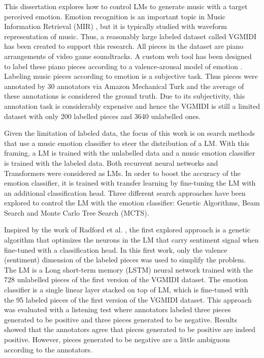 This dissertation explores how to control LMs to generate music with a target perceived emotion. Emotion recognition is an important topic in Music Information Retrieval (MIR) \cite{kim2010music}, but it is typically studied with waveform representation of music. Thus, a reasonably large labeled dataset called VGMIDI has been created to support this research. All pieces in the dataset are piano arrangements of video game soundtracks. A custom web tool has been designed to label these piano pieces according to a valence-arousal model of emotion \cite{russell1980circumplex}. Labeling music pieces according to emotion is a subjective task. Thus pieces were annotated by 30 annotators via Amazon Mechanical Turk and the average of these annotations is considered the ground truth. Due to its subjectivity, this annotation task is considerably expensive and hence the VGMIDI is still a limited dataset with only 200 labelled pieces and 3640 unlabelled ones.

Given the limitation of labeled data, the focus of this work is on search methods that use a music emotion classifier to steer the distribution of a LM. With this framing, a LM is trained with the unlabelled data and a music emotion classifier is trained with the labeled data. Both recurrent neural networks and Transformers were considered as LMs. In order to boost the accuracy of the emotion classifier, it is trained with transfer learning by fine-tuning the LM with an additional classification head. Three different search approaches have been explored to control the LM with the emotion classifier: Genetic Algorithms, Beam Search and Monte Carlo Tree Search (MCTS).

Inspired by the work of Radford et al. \cite{radford_2017}, the first explored approach is a genetic algorithm that optimizes the neurons in the LM that carry sentiment signal when fine-tuned with a classification head. In this first work, only the valence (sentiment) dimension of the labeled pieces was used to simplify the problem. The LM is a Long short-term memory (LSTM) neural network trained with the 728 unlabelled pieces of the first version of the VGMIDI dataset. The emotion classifier is a single linear layer stacked on top of LM, which is fine-tuned with the 95 labeled pieces of the first version of the VGMIDI dataset. This approach was evaluated with a listening test where annotators labeled three pieces generated to be positive and three pieces generated to be negative. Results showed that the annotators agree that pieces generated to be positive are indeed positive. However, pieces generated to be negative are a little ambiguous according to the annotators.

